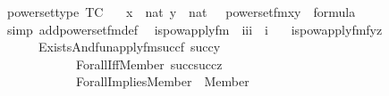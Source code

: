 \begin{isabellebody}
\isanewline
{}\isamarkupfalse%
\ powerset{\isacharunderscore}{\kern0pt}type\ {\isacharbrackleft}{\kern0pt}TC{\isacharbrackright}{\kern0pt}{\isacharcolon}{\kern0pt}\isanewline
\ \ {\isachardoublequoteopen}{\isasymlbrakk}\ x\ {\isasymin}\ nat{\isacharsemicolon}{\kern0pt}\ y\ {\isasymin}\ nat\ {\isasymrbrakk}\ {\isasymLongrightarrow}\ powerset{\isacharunderscore}{\kern0pt}fm{\isacharparenleft}{\kern0pt}x{\isacharcomma}{\kern0pt}y{\isacharparenright}{\kern0pt}\ {\isasymin}\ formula{\isachardoublequoteclose}\isanewline
%
\isadelimproof
\ \ %
\endisadelimproof
%
\isatagproof
{}\isamarkupfalse%
\ {\isacharparenleft}{\kern0pt}simp\ add{\isacharcolon}{\kern0pt}powerset{\isacharunderscore}{\kern0pt}fm{\isacharunderscore}{\kern0pt}def{\isacharparenright}{\kern0pt}%
\endisatagproof
{\isafoldproof}%
%
\isadelimproof
\isanewline
%
\endisadelimproof
\isanewline
{}\isamarkupfalse%
\isanewline
\ \ is{\isacharunderscore}{\kern0pt}powapply{\isacharunderscore}{\kern0pt}fm\ {\isacharcolon}{\kern0pt}{\isacharcolon}{\kern0pt}\ {\isachardoublequoteopen}{\isacharbrackleft}{\kern0pt}i{\isacharcomma}{\kern0pt}i{\isacharcomma}{\kern0pt}i{\isacharbrackright}{\kern0pt}\ {\isasymRightarrow}\ i{\isachardoublequoteclose}\ \isanewline
\ \ {\isachardoublequoteopen}is{\isacharunderscore}{\kern0pt}powapply{\isacharunderscore}{\kern0pt}fm{\isacharparenleft}{\kern0pt}f{\isacharcomma}{\kern0pt}y{\isacharcomma}{\kern0pt}z{\isacharparenright}{\kern0pt}\ {\isasymequiv}\isanewline
\ \ \ \ \ \ Exists{\isacharparenleft}{\kern0pt}And{\isacharparenleft}{\kern0pt}fun{\isacharunderscore}{\kern0pt}apply{\isacharunderscore}{\kern0pt}fm{\isacharparenleft}{\kern0pt}succ{\isacharparenleft}{\kern0pt}f{\isacharparenright}{\kern0pt}{\isacharcomma}{\kern0pt}\ succ{\isacharparenleft}{\kern0pt}y{\isacharparenright}{\kern0pt}{\isacharcomma}{\kern0pt}\ {}{\isacharparenright}{\kern0pt}{\isacharcomma}{\kern0pt}\isanewline
\ \ \ \ \ \ \ \ \ \ \ \ Forall{\isacharparenleft}{\kern0pt}Iff{\isacharparenleft}{\kern0pt}Member{\isacharparenleft}{\kern0pt}{}{\isacharcomma}{\kern0pt}\ succ{\isacharparenleft}{\kern0pt}succ{\isacharparenleft}{\kern0pt}z{\isacharparenright}{\kern0pt}{\isacharparenright}{\kern0pt}{\isacharparenright}{\kern0pt}{\isacharcomma}{\kern0pt}\isanewline
\ \ \ \ \ \ \ \ \ \ \ \ Forall{\isacharparenleft}{\kern0pt}Implies{\isacharparenleft}{\kern0pt}Member{\isacharparenleft}{\kern0pt}{}{\isacharcomma}{\kern0pt}\ {}{\isacharparenright}{\kern0pt}{\isacharcomma}{\kern0pt}\ Member{\isacharparenleft}{\kern0pt}{}{\isacharcomma}{\kern0pt}\ {}{\isacharparenright}{\kern0pt}{\isacharparenright}{\kern0pt}{\isacharparenright}{\kern0pt}{\isacharparenright}{\kern0pt}{\isacharparenright}{\kern0pt}{\isacharparenright}{\kern0pt}{\isacharparenright}{\kern0pt}{\isachardoublequoteclose}\isanewline

\end{isabellebody}
